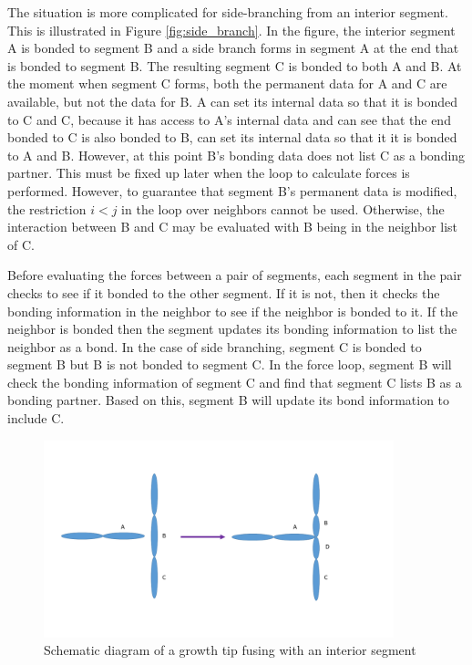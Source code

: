 \documentclass[12pt]{article}
\begin{document}
The situation is more complicated for side-branching from an interior segment. This
is illustrated in Figure \ref{fig:side_branch}. In the figure, the interior segment A is bonded
to segment B and a side branch forms in segment A at the end that is bonded to segment B. The
resulting segment C is bonded to both A and B. At the moment when segment C forms, both the
permanent data for A and C are available, but not the data for B. A can set its internal data
so that it is bonded to C and C, because it has access to A's internal data and can see that the
end bonded to C is also bonded to B, can set its
internal data so that it it is bonded to A and B. However, at this point B's bonding data does
not list C as a bonding partner. This must be fixed up later when the loop to calculate forces
is performed.  However, to
guarantee that segment B's permanent data is modified, the restriction $i<j$ in
the loop over neighbors cannot be used.
Otherwise, the interaction between B and C may be evaluated with B being in the
neighbor list of C.

Before evaluating the forces between a pair of segments, each segment in the pair
checks to see if it bonded to the other segment. If it is not, then it checks the bonding
information in the neighbor to see if the neighbor is bonded to it. If the neighbor is bonded
then the segment updates its bonding information to list the neighbor as a bond. In the case
of side branching, segment C is bonded to segment B but B is not bonded to segment C.
In the force loop, segment B will check the bonding information of segment C and find that
segment C lists B as a bonding partner. Based on this, segment B will update its bond
information to include C.

\begin{figure}
\centering
\includegraphics[width=4.0in,keepaspectratio=true]{fusion}
\caption{\label{fig:fusion} Schematic diagram of a growth tip fusing with an interior segment}
\end{figure}
\end{document}
